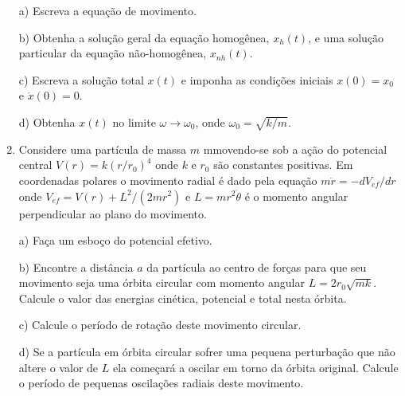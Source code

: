 \begin{enumerate}[start=1,label={\bfseries Q\arabic*.}]
a) Escreva a equação de movimento.

\resposta

b) Obtenha a solução geral da equação homogênea, $x_{h}(t)$, e uma solução particular da equação não-homogênea, $x_{nh}(t)$.

\resposta

c) Escreva a solução total $x(t)$ e imponha as condições iniciais $x(0) = x_{0}$ e $\dot{x}(0) = 0$.

\resposta
  
d) Obtenha $x(t)$ no limite $\omega \rightarrow \omega_{0}$, onde $\omega_{0} = \sqrt{k/m}$.

\resposta


\item Considere uma partícula de massa $m$ mmovendo-se sob a ação do potencial central $V(r) = k(r/r_{0})^{4}$ onde $k$ e $r_{0}$ são constantes positivas. Em coordenadas polares o movimento radial é dado pela equação $m\ddot{r} = - d V_{ef}/dr$ onde $V_{ef} = V(r) + L^{2}/(2mr^{2})$ e $L = mr^{2} \dot{\theta}$ é o momento angular perpendicular ao plano do movimento.


a) Faça um esboço do potencial efetivo.

\resposta

b) Encontre a distância $a$ da partícula ao centro de forças para que seu movimento seja uma órbita circular com momento angular $L = 2 r_{0} \sqrt{mk}$. Calcule o valor das energias cinética, potencial e total nesta órbita.

\resposta

c) Calcule o período de rotação deste movimento circular.

\resposta

d) Se a partícula em órbita circular sofrer uma pequena perturbação que não altere o valor de $L$ ela começará a oscilar em torno da órbita original. Calcule o período de pequenas oscilações radiais deste movimento.

\resposta




\end{enumerate}






